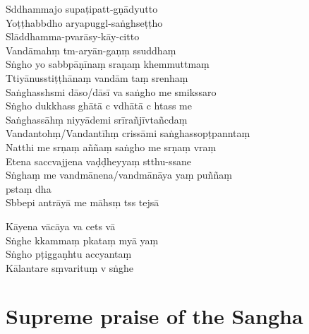 Sddhammajo supaṭipatt-gṇādyutto\\
Yoṭṭhabbdho aryapuggl-saṅghseṭṭho\\
Slāddhamma-pvarāsy-kāy-citto\\
Vandāmahṃ tm-aryān-gaṇṃ ssuddhaṃ\\
Sṅgho yo sabbpāṇīnaṃ sraṇaṃ khemmuttmaṃ\\
Ttiyānusstiṭṭhānaṃ vandām taṃ srenhaṃ\\
Saṅghasshsmi dāso/dāsī va saṅgho me smikssaro\\
Sṅgho dukkhass ghātā c vdhātā c htass me\\
Saṅghassāhṃ niyyādemi srīrañjīvtañcdaṃ\\
Vandantohṃ/Vandantīhṃ crissāmi saṅghassopṭpanntaṃ\\
Natthi me srṇaṃ aññaṃ saṅgho me srṇaṃ vraṃ\\
Etena saccvajjena vaḍḍheyyaṃ stthu-ssane\\
Sṅghaṃ me vandmānena/vandmānāya yaṃ puññaṃ\\
pstaṃ dha\\
Sbbepi antrāyā me māhsṃ tss tejsā


Kāyena vācāya va cets vā\\
Sṅghe kkammaṃ pkataṃ myā yaṃ\\
Sṅgho pṭiggaṇhtu accyantaṃ\\
Kālantare sṃvarituṃ v sṅghe

\chapter{Supreme praise of the Sangha}

\begin{leader}
\end{leader}

